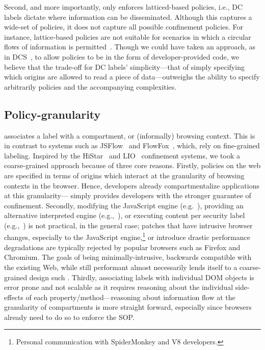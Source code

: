Second, and more importantly, \sys{} only enforces latticed-based
policies, i.e., DC labels dictate where information can be
disseminated.
%
Although this captures a wide-set of policies, it does not capture all
possible confinement policies.
%
For instance, lattice-based policies are not suitable for scenarios in
which a circular flows of information is permitted~\cite{Badger:1995}.
%
Though we could have taken an approach, as in DCS~\cite{Akhawe2013},
to allow policies to be in the form of developer-provided code, we
believe that the trade-off for DC labels' simplicity---that of simply
specifying which origins are allowed to read a piece of
data---outweighs the ability to specify arbitrarily policies and the
accompanying complexities.


\subsection{Policy-granularity}
\label{sec:discussion:granularity}

\sys{} associates a label with a compartment, or (informally) browsing
context.
%
This is in contrast to systems such as JSFlow~\cite{Hedin:2012} and
FlowFox~\cite{DeGroef:2012}, which, rely on fine-grained labeling.
%
Inspired by the HiStar~\cite{Zeldovich:2006} and
LIO~\cite{stefan:2011:flexible} confinement systems, we took a coarse-grained
approach because of three core reasons.
%
Firstly, policies on the web are specified in terms of origins which
interact at the granularity of browsing contexts in the browser.
%
Hence, developers already compartmentalize applications at this
granularity---\sys{} simply provides developers with the stronger
guarantee of confinement.
%
Secondly, modifying the JavaScript engine (e.g.~),
providing an alternative interpreted engine (e.g.,~\cite{Hedin:2012}),
or executing content per security label (e.g.,~\cite{DeGroef:2012}) is
not practical, in the general case;
patches that have intrusive browser changes, especially to the
JavaScript engine,\footnote{
  Personal communication with SpiderMonkey and V8 developers.
} or introduce drastic performance degradations are typically rejected
by popular browsers such as Firefox and Chromium.
%
The goals of being minimally-intrusive, backwards compatible with the
existing Web, while still performant almost necessarily lends itself
to a coarse-grained design such \sys{}.
%
Thirdly, associating labels with individual DOM objects is error
prone and not scalable as it requires reasoning about the individual
side-effects of each property/method---reasoning about information
flow at the granularity of compartments is more straight forward,
especially since browsers already need to do so to enforce the SOP.

